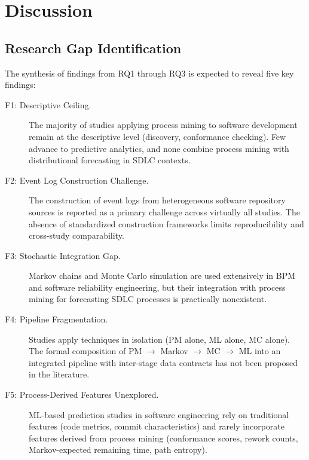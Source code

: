 \section{Discussion}
\label{sec:slr-discussion}

\subsection{Research Gap Identification}
\label{sec:slr-gaps}


The synthesis of findings from RQ1 through RQ3 is expected to reveal five key findings:

\begin{description}
\item[F1: Descriptive Ceiling.] The majority of studies applying process mining to software development remain at the descriptive level (discovery, conformance checking). Few advance to predictive analytics, and none combine process mining with distributional forecasting in SDLC contexts.

\item[F2: Event Log Construction Challenge.] The construction of event logs from heterogeneous software repository sources is reported as a primary challenge across virtually all studies. The absence of standardized construction frameworks limits reproducibility and cross-study comparability.

\item[F3: Stochastic Integration Gap.] Markov chains and Monte Carlo simulation are used extensively in BPM and software reliability engineering, but their integration with process mining for forecasting SDLC processes is practically nonexistent.

\item[F4: Pipeline Fragmentation.] Studies apply techniques in isolation (PM alone, ML alone, MC alone). The formal composition of PM $\rightarrow$ Markov $\rightarrow$ MC $\rightarrow$ ML into an integrated pipeline with inter-stage data contracts has not been proposed in the literature.

\item[F5: Process-Derived Features Unexplored.] ML-based prediction studies in software engineering rely on traditional features (code metrics, commit characteristics) and rarely incorporate features derived from process mining (conformance scores, rework counts, Markov-expected remaining time, path entropy).
\end{description}

